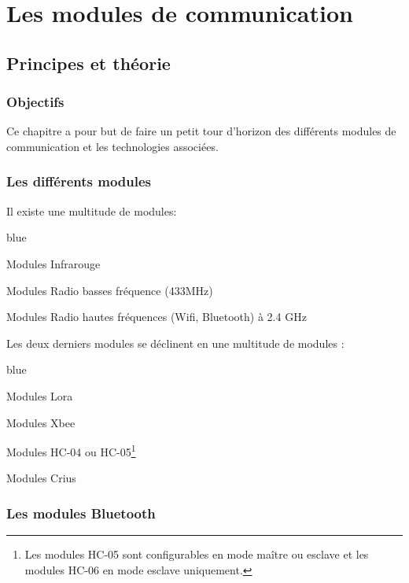 \part{Les modules de communication}



\chapter{Principes et théorie}
\section{Objectifs}

Ce chapitre a pour but de faire un petit tour d'horizon des différents modules de communication et les technologies associées.


\section{Les différents modules}

Il existe une multitude de modules: 


\begin{items}{blue}{\Circle}

    \item Modules Infrarouge
    \item Modules Radio basses fréquence (433MHz) 
    \item Modules Radio hautes fréquences (Wifi, Bluetooth) à 2.4 GHz

\end{items}

Les deux derniers modules se déclinent en une multitude de modules : 

\begin{items}{blue}{\Circle}

    \item Modules Lora
    \item Modules Xbee
    \item Modules HC-04 ou HC-05\footnote{Les modules HC-05 sont configurables en mode maître ou esclave et les modules HC-06 en 
    mode esclave uniquement.}
    \item Modules Crius
\end{items}


\section{Les modules Bluetooth}


